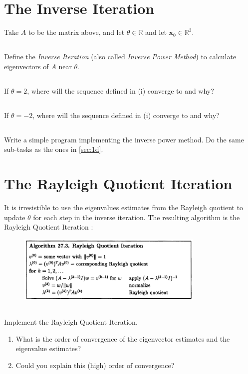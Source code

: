\documentclass[11pt,letterpaper]{article}
\begin{document}
\section{The Inverse Iteration}
Take $A$ to be the matrix above, and let $\theta\in\mathbb{R}$ and let ${\boldsymbol x_0}\in\mathbb{R}^3$.
\subsection{}
Define the \emph{Inverse Iteration} (also called
  \emph{Inverse Power Method}) to calculate eigenvectors of $A$ near
  $\theta$.

\subsection{}
If $\theta=2$, where will the sequence defined in (i)
  converge to and why?

\subsection{}
If $\theta=-2$, where will the sequence defined in (i)
  converge to and why?

\subsection{}
Write a simple program implementing the inverse power method. Do the same sub-tasks as the ones in \ref{sec:1d}.

\section{The Rayleigh Quotient Iteration}
It is irresistible to use the eigenvalues estimates from the Rayleigh quotient to update $\theta$ for each step in the inverse iteration. The resulting algorithm is the Rayleigh Quotient Iteration \parencite{TrefethenBau_97}:
\begin{figure}[H]
    \centering
    \includegraphics[width = 0.8\textwidth]{Session_8/latex/figs/TB_Rayleigh_Quo_Iter}
\end{figure}

\subsection{}
Implement the Rayleigh Quotient Iteration. 
\begin{enumerate}
    \item What is the order of convergence of the eigenvector estimates and the eigenvalue estimates?
    \item Could you explain this (high) order of convergence?
\end{enumerate}

\vfill
\printbibliography
\end{document}
